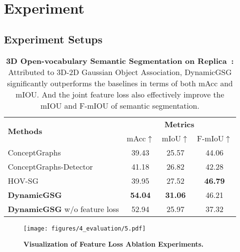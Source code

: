 \section{Experiment}
\label{sec:experiment}
\subsection{Experiment Setups}
\label{subsec:experiment_setup}

\renewcommand{\arraystretch}{1.2}
\begin{table}[!t]
    \centering
    \begin{tabular}{lccc}\toprule
\multirow{2}{*}{\textbf{Methods}}      & \multicolumn{3}{c}{\textbf{Metrics}} \\
& mAcc$\uparrow$        & mIoU$\uparrow$   & F-mIoU$\uparrow$   \\ \midrule 

ConceptGraphs~\cite{gu2023conceptgraphsopenvocabulary3dscene}       & 39.43                    & 25.57   & 44.06     \\

ConceptGraphs-Detector~\cite{gu2023conceptgraphsopenvocabulary3dscene} & 41.18                        & 26.82       & 42.28             \\

HOV-SG~\cite{werby23hovsg}  & 39.95                     & 27.52        & \textbf{46.79}      \\

\textbf{DynamicGSG}   & \textbf{54.04}              & \textbf{31.06}               & 46.21               \\

\textbf{DynamicGSG} w/o feature loss   & 52.94                                & 25.97     & 37.32       \\
 \bottomrule
\end{tabular}
    \caption{\textbf{3D Open-vocabulary Semantic Segmentation on Replica~\cite{replica19arxiv}:} Attributed to 3D-2D Gaussian Object Association, DynamicGSG significantly outperforms the baselines in terms of both mAcc and mIOU. And the joint feature loss also effectively improve the mIOU and F-mIOU of semantic segmentation.}
    \label{tab:semseg}
    \vspace{-1em}
\end{table}

\begin{figure}[tb]
  \centering
  \texttt{[image: figures/4\_evaluation/5.pdf]}
  \caption{\textbf{Visualization of Feature Loss Ablation Experiments.}}
  \label{fig:feature_ablation}
      \vspace{-1em}
\end{figure}

